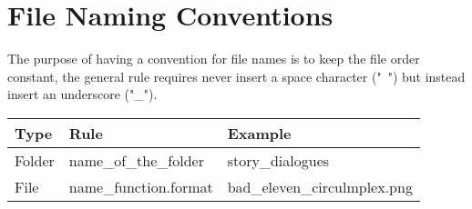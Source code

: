 \section{File Naming Conventions}
The purpose of having a convention for file names is to keep the file order constant, the general rule requires never insert a space character ("\ ") but instead insert an underscore ("\_").

\begin{center}
	\begin{tabular}[c]{| p{3cm} | p{5cm} | p{5cm} |}
		\hline
		\textbf{Type} & \textbf{Rule}  & \textbf{Example}\\
		\hline
		Folder & name\_of\_the\_folder & story\_dialogues\\
		\hline
		File & name\_function.format & bad\_eleven\_circulmplex.png\\
		\hline
	\end{tabular}
\end{center}